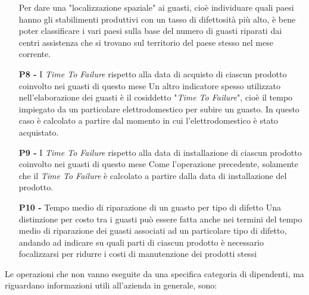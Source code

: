 \documentclass[a4paper, 12pt]{report}
\begin{document}
\begin{itemize}
		\subitem Per dare una "localizzazione spaziale" ai guasti, cioè individuare quali paesi hanno gli stabilimenti produttivi con un tasso di difettosità più alto, è bene
		poter classificare i vari paesi sulla base del numero di guasti riparati dai centri assistenza che si trovano sul territorio del paese stesso nel mese corrente.
	\item[\textbf{P8 -}] I \textit{Time To Failure} rispetto alla data di acquisto di ciascun prodotto coinvolto nei guasti di questo mese
		\subitem Un altro indicatore spesso utilizzato nell'elaborazione dei guasti è il cosiddetto "\textit{Time To Failure}", cioè il tempo impiegato da un particolare elettrodomestico
		per subire un guasto. In questo caso è calcolato a partire dal momento in cui l'elettrodomestico è stato acquistato.
	\item[\textbf{P9 -}] I \textit{Time To Failure} rispetto alla data di installazione di ciascun prodotto coinvolto nei guasti di questo mese
		\subitem Come l'operazione precedente, solamente che il \textit{Time To Failure} è calcolato a partire dalla data di installazione del prodotto.
	\item[\textbf{P10 -}] Tempo medio di riparazione di un guasto per tipo di difetto
		\subitem Una distinzione per costo tra i guasti può essere fatta anche nei termini del tempo medio di riparazione dei guasti associati ad un particolare tipo di difetto,
		andando ad indicare su quali parti di ciascun prodotto è necessario focalizzarsi per ridurre i costi di manutenzione dei prodotti stessi
\end{itemize}

\newpage

Le operazioni che non vanno eseguite da una specifica categoria di dipendenti, ma riguardano informazioni utili all'azienda in generale, sono:
\end{document}
